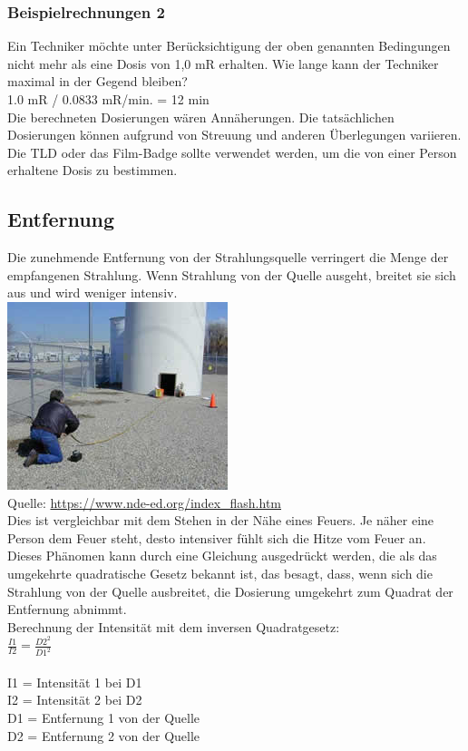 \subsubsection{Beispielrechnungen 2}
Ein Techniker möchte unter Berücksichtigung der oben genannten Bedingungen nicht mehr als eine Dosis von 1,0 mR erhalten. Wie lange kann der Techniker maximal in der Gegend bleiben?\\
1.0 mR / 0.0833 mR/min. = 12 min \\
Die berechneten Dosierungen wären Annäherungen. Die tatsächlichen Dosierungen können aufgrund von Streuung und anderen Überlegungen variieren. Die TLD oder das Film-Badge sollte verwendet werden, um die von einer Person erhaltene Dosis zu bestimmen.
\subsection{Entfernung}
Die zunehmende Entfernung von der Strahlungsquelle verringert die Menge der empfangenen Strahlung. Wenn Strahlung von der Quelle ausgeht, breitet sie sich aus und wird weniger intensiv.\\
\includegraphics[scale=0.5]{img/distance.jpg}\\
Quelle: \url{https://www.nde-ed.org/index_flash.htm}\\
Dies ist vergleichbar mit dem Stehen in der Nähe eines Feuers. Je näher eine Person dem Feuer steht, desto intensiver fühlt sich die Hitze vom Feuer an. Dieses Phänomen kann durch eine Gleichung ausgedrückt werden, die als das umgekehrte quadratische Gesetz bekannt ist, das besagt, dass, wenn sich die Strahlung von der Quelle ausbreitet, die Dosierung umgekehrt zum Quadrat der Entfernung abnimmt.\\
Berechnung der Intensität mit dem inversen Quadratgesetz: \\

\( \frac {I1}  {I2} = \frac {D2^2} { D1^2} \) \\
\\
I1 = Intensität 1 bei D1 \\
I2 = Intensität 2 bei D2 \\
D1 = Entfernung 1 von der Quelle\\
D2 = Entfernung 2 von der Quelle\\

